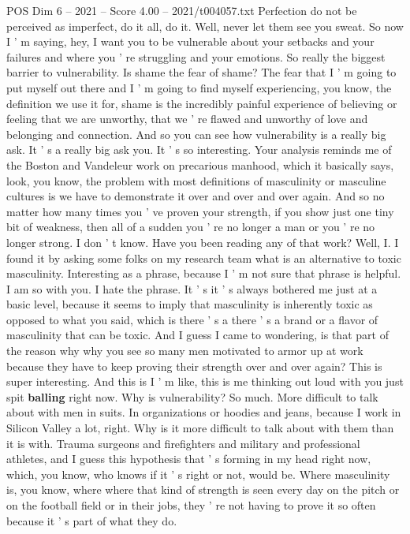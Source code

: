 \begin{textsample}{POS Dim 6 – 2021 – Score 4.00 – 2021/t004057.txt}
Perfection do not be perceived as imperfect, do it all, do it.
Well, never let them see you sweat.
So now I ' m saying, hey, I want you to be vulnerable about your setbacks and your failures and where you ' re struggling and your emotions.
So really the biggest barrier to vulnerability.
Is shame the fear of shame?
The fear that I ' m going to put myself out there and I ' m going to find myself experiencing, you know, the definition we use it for, shame is the incredibly painful experience of believing or feeling that we are unworthy, that we ' re flawed and unworthy of love and belonging and connection.
And so you can see how vulnerability is a really big ask.
It ' s a really big ask you.
It ' s so interesting.
Your analysis reminds me of the Boston and Vandeleur work on precarious manhood, which it basically says, look, you know, the problem with most definitions of masculinity or masculine cultures is we have to demonstrate it over and over and over again.
And so no matter how many times you ' ve proven your strength, if you show just one tiny bit of weakness, then all of a sudden you ' re no longer a man or you ' re no longer strong.
I don ' t know.
Have you been reading any of that work?
Well, I.
I found it by asking some folks on my research team what is an alternative to toxic masculinity.
Interesting as a phrase, because I ' m not sure that phrase is helpful.
I am so with you.
I hate the phrase.
It ' s it ' s always bothered me just at a basic level, because it seems to imply that masculinity is inherently toxic as opposed to what you said, which is there ' s a there ' s a brand or a flavor of masculinity that can be toxic.
And I guess I came to wondering, is that part of the reason why why you see so many men motivated to armor up at work because they have to keep proving their strength over and over again?
This is super interesting.
And this is I ' m like, this is me thinking out loud with you just spit \textbf{balling} right now.
Why is vulnerability?
So much.
More difficult to talk about with men in suits.
In organizations or hoodies and jeans, because I work in Silicon Valley a lot, right.
Why is it more difficult to talk about with them than it is with.
Trauma surgeons and firefighters and military and professional athletes, and I guess this hypothesis that ' s forming in my head right now, which, you know, who knows if it ' s right or not, would be.
Where masculinity is, you know, where where that kind of strength is seen every day on the pitch or on the football field or in their jobs, they ' re not having to prove it so often because it ' s part of what they do.

\end{textsample}
